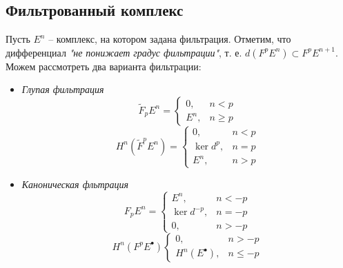 \documentclass[../main.tex]{subfiles}
\begin{document}
\subsection{Фильтрованный комплекс}
Пусть $E^n$  -- комплекс, на котором задана фильтрация. Отметим, что дифференциал \textit{"не понижает градус фильтрации"}, т. е.  $d(F^pE^n)\subset F^p E^{n+1}$. Можем рассмотреть два варианта фильтрации:
\begin{itemize}
\item \textit{Глупая фильтрация}
\[
\widetilde{F}_p E^n = \begin{cases} 0, &n < p \\ E^n, & n \ge p \end{cases}
\]
\[
H^n(\widetilde{F}^p E^n) = \begin{cases} 0, &n < p\\ \ker d^p, & n=p \\ E^n, & n > p \end{cases}
\]
\bee
{}
\eee
\item \textit{Каноническая фльтрация}
\[
F_p E^n = \begin{cases} E^n, &n < -p \\ \ker d^{-p}, & n = -p \\ 0, & n>-p \end{cases}
\]
\[
H^n (F^p E^\bullet) \begin{cases} 0, &n > -p \\ H^n(E^\bullet), & n\le-p \end{cases}
\]
\bee
{}
\eee
\end{itemize}
\end{document}
